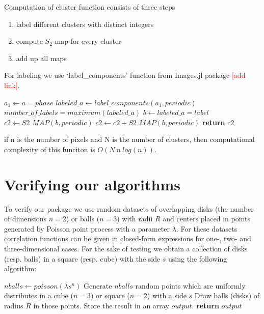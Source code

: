 \documentclass[reprint,amsmath,amssymb,aps,pre,showkeys,showpacs,nofootinbib]{revtex4-1}
\begin{document}
Computation of cluster function consists of three steps
\begin{enumerate}
  \item label different clusters with distinct integers
  \item compute $S_2$ map for every cluster
  \item add up all maps
\end{enumerate}

For labeling we use `label\_components' function from
Images.jl package \textcolor{red}{[add link]}.

\begin{algorithmic}[1]
    \State $a_1 \gets a = phase$
    \State $labeled\_a \gets label\_components(a_1, periodic)$
    \State $number\_of\_labels = maximum(labeled\_a)$
      \State $b \gets labeled\_a = label$
        \State $c2 \gets S2\_MAP(b, periodic)$
      \Else
        \State $c2 \gets c2 + S2\_MAP(b, periodic)$
      \EndIf
    \EndFor
    \State \textbf{return} $c2$
  \EndProcedure
\end{algorithmic}

if n is the number of pixels and N is the number of clusters, then computational complexity
of this funciton is $O(N\ n\ log(n))$.

\section{Verifying our algorithms}
\label{verisec}
To verify our package we use random datasets of overlapping disks (the number of
dimensions $n = 2$) or balls ($n = 3$) with radii $R$ and centers placed in
points generated by Poisson point process with a parameter $\lambda$. For these
datasets correlation functions can be given in closed-form expressions for one-,
two- and three-dimensional cases. For the sake of testing we obtain a collection
of disks (resp. balls) in a square (resp. cube) with the side $s$ using the
following algorithm:
\begin{algorithmic}[1]
  \label{testdata}
    \State $nballs \gets poisson(\lambda s^n)$ 
    \State Generate $nballs$ random points which are uniformly distributes in
    a cube ($n = 3$) or square ($n = 2$) with a side $s$
    \State Draw balls (disks) of radius $R$ in those points. Store the result in
    an array $output$.
    \State \textbf{return} $output$
  \EndProcedure
\end{algorithmic}
\end{document}
